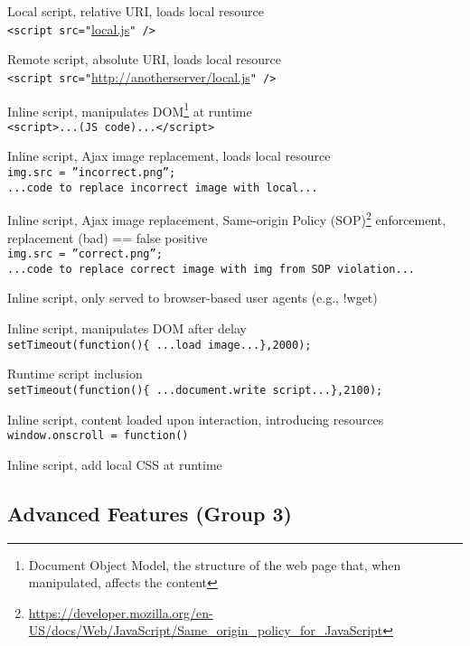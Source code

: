 \documentclass{acm_proc}
\begin{document}
\vspace{-1.0em}
\begin{description}\itemsep0pt \parskip0pt 
\item[2a.] Local script, relative URI, loads local resource\\\texttt{<script src="}\url{local.js}\texttt{" />}
\item[2b.] Remote script, absolute URI, loads local resource\\\texttt{<script src="}\url{http://anotherserver/local.js}\texttt{" />}
\item[2c.] Inline script, manipulates DOM\footnote{Document Object Model, the structure of the web page that, when manipulated, affects the content} at runtime\\\texttt{<script>...(JS code)...</script>}
\item[2d.] Inline script, Ajax image replacement, loads local resource\\\texttt{img.src = ''incorrect.png'';\\...code to replace incorrect image with local...}
\item[2e.] Inline script, Ajax image replacement, Same-origin Policy (SOP)\footnote{\url{https://developer.mozilla.org/en-US/docs/Web/JavaScript/Same_origin_policy_for_JavaScript}} enforcement, replacement (bad) == false positive\\\texttt{img.src = ''correct.png'';\\...code to replace correct image with img from SOP violation...}
\item[2f.] Inline script, only served to browser-based user agents (e.g., !wget)
\item[2g.] Inline script, manipulates DOM after delay\\\texttt{setTimeout(function()\{ ...load image...\},2000);}
\item[2h.] Runtime script inclusion\\\texttt{setTimeout(function()\{ ...document.write script...\},2100);}
\item[2i.] Inline script, content loaded upon interaction, introducing resources\\\texttt{window.onscroll = function(){}}
\item[2j.] Inline script, add local CSS at runtime
\end{description}

\subsection{Advanced Features (Group 3)}
\end{document}
